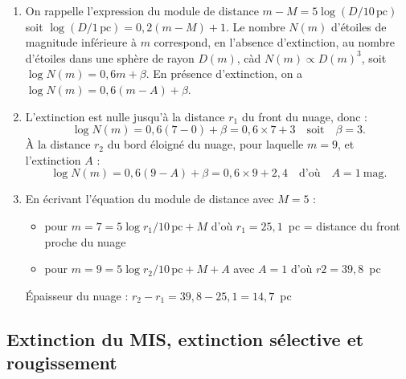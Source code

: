 \documentclass[a4paper,10pt]{report}
\renewcommand{\u}[1]{\ensuremath{\mathrm{#1}}} %
\begin{document}
\begin{Answer}
  \begin{enumerate}
  \item On rappelle l'expression du module de distance $m-M =
    5\log(D/10\,\u{pc})$ soit $\log(D/1\,\u{pc}) = 0,2(m-M)+1$. Le
    nombre $N(m)$ d'étoiles de magnitude inférieure à $m$ correspond,
    en l'absence d'extinction, au nombre d'étoiles dans une sphère de
    rayon $D(m)$, càd $N(m) \propto D(m)^3$, soit $\log N(m) = 0,6 m +
    \beta$.  En présence d'extinction, on a $\log N(m) = 0,6(m-A) +
    \beta$.
  \item L'extinction est nulle jusqu'à la distance $r_1$ du front du
    nuage, donc :
    $$
    \log{N(m)} = 0,6 (7-0) + \beta = 0,6\times 7 + 3
    \quad\text{soit}\quad \beta=3.
    $$
    À la distance $r_2$ du bord éloigné du nuage, pour laquelle $m =
    9$, et l'extinction $A$ :
    $$
    \log{N(m)} = 0,6 (9-A) + \beta = 0,6\times 9 + 2,4
    \quad\text{d'où}\quad A = 1~\u{mag}.
    $$
  \item En écrivant l'équation du module de distance avec $M=5$ :
    \begin{itemize}
    \item pour $m = 7 = 5\log{r_1/10\,\u{pc}}+M$ d'où $r_1 = 25,1$~pc
      = distance du front proche du nuage
    \item pour $m = 9 = 5\log{r_2/10\,\u{pc}}+M+A$ avec $A=1$ d'où $r2
      = 39,8$~pc
    \end{itemize}
    Épaisseur du nuage : $r_2-r_1 = 39,8-25,1 = 14,7$~pc
  \end{enumerate}
\end{Answer}

\subsection{Extinction du MIS, extinction sélective et rougissement}
\end{document}
